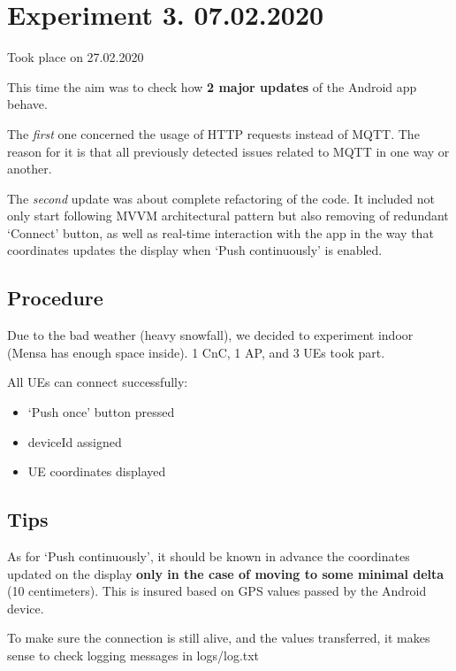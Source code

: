 \hypertarget{experiment-3.-07.02.2020}{%
\section{Experiment 3. 07.02.2020}\label{experiment-3.-07.02.2020}}

Took place on 27.02.2020

This time the aim was to check how \textbf{2 major updates} of the
Android app behave.

The \emph{first} one concerned the usage of HTTP requests instead of
MQTT. The reason for it is that all previously detected issues related
to MQTT in one way or another.

The \emph{second} update was about complete refactoring of the code. It
included not only start following MVVM architectural pattern but also
removing of redundant `Connect' button, as well as real-time interaction
with the app in the way that coordinates updates the display when `Push
continuously' is enabled.

\hypertarget{procedure}{%
\subsection{Procedure}\label{procedure}}

Due to the bad weather (heavy snowfall), we decided to experiment indoor
(Mensa has enough space inside). 1 CnC, 1 AP, and 3 UEs took part.

All UEs can connect successfully:

\begin{itemize}
\tightlist
\item
  `Push once' button pressed
\item
  deviceId assigned
\item
  UE coordinates displayed
\end{itemize}

\hypertarget{tips}{%
\subsection{Tips}\label{tips}}

As for `Push continuously', it should be known in advance the
coordinates updated on the display \textbf{only in the case of moving to
some minimal delta} (10 centimeters). This is insured based on GPS
values passed by the Android device.

To make sure the connection is still alive, and the values transferred,
it makes sense to check logging messages in logs/log.txt

